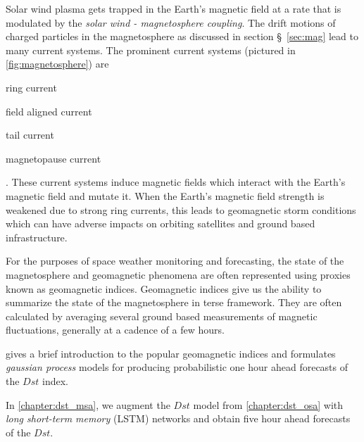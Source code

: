 Solar wind plasma gets trapped in the Earth's magnetic field at a rate that is modulated by the 
\emph{solar wind - magnetosphere coupling}. The drift motions of charged particles in the 
magnetosphere as discussed in section \S~\ref{sec:mag} lead to many current systems. The prominent 
current systems (pictured in \cref{fig:magnetosphere}) are 
%
\begin{enumerate*} 
    \item ring current 
    \item field aligned current 
    \item tail current 
    \item magnetopause current 
\end{enumerate*}.  
%
These current systems induce magnetic fields which interact with the Earth's magnetic field and 
mutate it. When the Earth's magnetic field strength is weakened due to strong ring currents, this 
leads to geomagnetic storm conditions which can have adverse impacts on orbiting satellites and 
ground based infrastructure.

For the purposes of space weather monitoring and forecasting, the state of the magnetosphere and 
geomagnetic phenomena are often represented using proxies known as geomagnetic indices. Geomagnetic 
indices give us the ability to summarize the state of the magnetosphere in terse framework. They 
are often calculated by averaging several ground based measurements of magnetic fluctuations, 
generally at a cadence of a few hours.

 gives a brief introduction to the popular geomagnetic indices and formulates 
\emph{gaussian process} models for producing probabilistic one hour ahead forecasts of the $Dst$ 
index. 

In \cref{chapter:dst_msa}, we augment the $Dst$ model from \cref{chapter:dst_osa} with 
\emph{long short-term memory} (LSTM) networks and obtain five hour ahead forecasts of the $Dst$.

\clearpage

%
%
